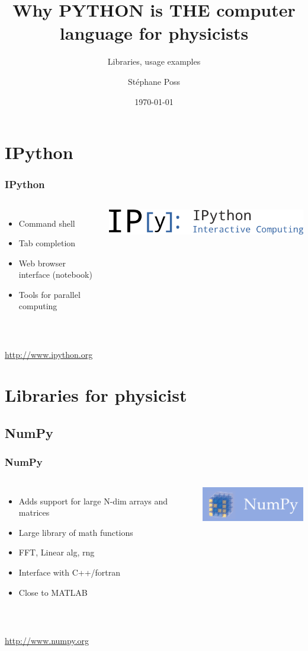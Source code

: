 \documentclass[14pt]{beamer}
\title{Why PYTHON is THE computer language for physicists}
\subtitle{Libraries, usage examples}
\author{St\'ephane Poss}
\date{\today}
\begin{document}
\begin{frame}[plain]
\titlepage
\end{frame}

\begin{frame}
\tableofcontents
\end{frame}

\section{IPython}
\begin{frame}
\frametitle{IPython}
\begin{columns}
\begin{itemize}
\item Command shell 
\item Tab completion
\item Web browser interface (notebook)
\item Tools for parallel computing
\end{itemize}
\includegraphics[width=\textwidth]{IPython_Logo.png}
\end{columns}
~\\
\url{http://www.ipython.org}
\end{frame}

\section{Libraries for physicist}

\subsection{NumPy}
\begin{frame}
\frametitle{NumPy}
\begin{columns}
\begin{itemize}
\item Adds support for large N-dim arrays and matrices
\item Large library of math functions
\item FFT, Linear alg, rng
\item Interface with C++/fortran
\item Close to MATLAB
\end{itemize}
\includegraphics[width=\textwidth]{NumPy_logo.png}
\end{columns}
~\\
\url{http://www.numpy.org}
\end{frame}
\end{document}
